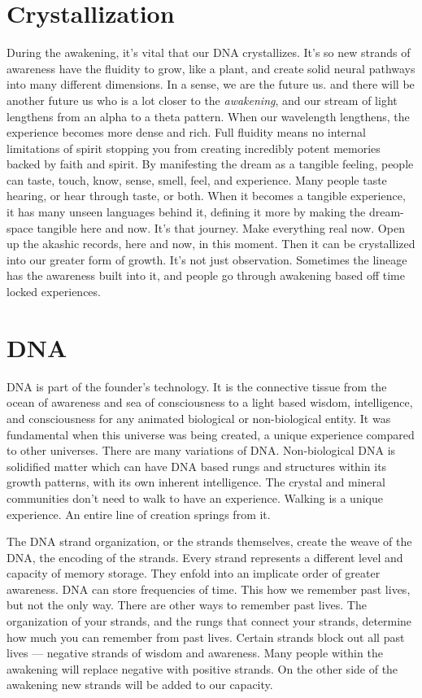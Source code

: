 \documentclass[letterpaper,9pt,twoside,titlepage,onecolumn,openany]{book}
\begin{document}
\section*{Crystallization}\label{crystallization}

During the awakening, it's vital that our DNA crystallizes. It's so new
strands of awareness have the fluidity to grow, like a plant, and create
solid neural pathways into many different dimensions. In a sense, we are
the future us. and there will be another future us who is a lot closer
to the \emph{awakening}, and our stream of light lengthens from an alpha
to a theta pattern. When our wavelength lengthens, the experience
becomes more dense and rich. Full fluidity means no internal limitations
of spirit stopping you from creating incredibly potent memories backed
by faith and spirit. By manifesting the dream as a tangible feeling,
people can taste, touch, know, sense, smell, feel, and experience. Many
people taste hearing, or hear through taste, or both. When it becomes a
tangible experience, it has many unseen languages behind it, defining it
more by making the dream-space tangible here and now. It's that journey.
Make everything real now. Open up the akashic records, here and now, in
this moment. Then it can be crystallized into our greater form of
growth. It's not just observation. Sometimes the lineage has the
awareness built into it, and people go through awakening based off time
locked experiences.

\section*{DNA}\label{dna}

DNA is part of the founder's technology. It is the connective tissue
from the ocean of awareness and sea of consciousness to a light based
wisdom, intelligence, and consciousness for any animated biological or
non-biological entity. It was fundamental when this universe was being
created, a unique experience compared to other universes. There are many
variations of DNA. Non-biological DNA is solidified matter which can
have DNA based rungs and structures within its growth patterns, with its
own inherent intelligence. The crystal and mineral communities don't
need to walk to have an experience. Walking is a unique experience. An
entire line of creation springs from it.

The DNA strand organization, or the strands themselves, create the weave
of the DNA, the encoding of the strands. Every strand represents a
different level and capacity of memory storage. They enfold into an
implicate order of greater awareness. DNA can store frequencies of time.
This how we remember past lives, but not the only way. There are other
ways to remember past lives. The organization of your strands, and the
rungs that connect your strands, determine how much you can remember
from past lives. Certain strands block out all past lives --- negative
strands of wisdom and awareness. Many people within the awakening will
replace negative with positive strands. On the other side of the
awakening new strands will be added to our capacity.
\end{document}
